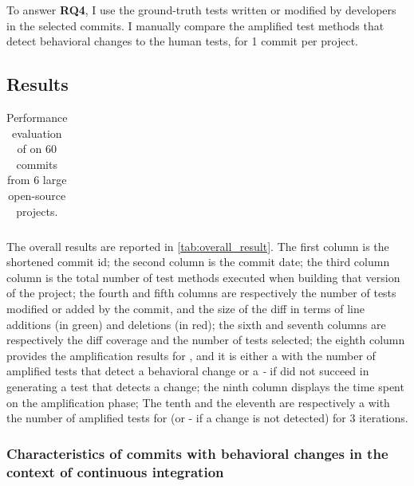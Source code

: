 To answer \textbf{RQ4}, I use the ground-truth tests written or modified by developers in the selected commits. %
I manually compare the amplified test methods that detect behavioral changes to the human tests, for 1 commit per project.

\subsection{Results}
\label{subsec:result}
\begin{table}
\centering
\small
\def\arraystretch{0.3}%
\setlength\tabcolsep{.35pt} %
\caption{Performance evaluation of \DCI on 60 commits from 6 large open-source projects.}
\label{tab:overall_result}
\begin{tabular}{l|c|rcccc|c|cc|cc|cc|cc}

\end{tabular}
\end{table}

The overall results are reported in \autoref{tab:overall_result}.
The first column is the shortened commit id;
the second column is the commit date;
the third column column is the total number of test methods executed when building that version of the project;
the fourth and fifth columns are respectively the number of tests modified or added by the commit, and the size of the diff in terms of line additions (in green) and deletions (in red);
the sixth and seventh columns are respectively the diff coverage and the number of tests \DCI selected;
the eighth column provides the amplification results for \DCIA, and it is either a \cmark with the number of amplified tests that detect a behavioral change or a \textit{-} if \DCI did not succeed in generating a test that detects a change;
the ninth column displays the time spent on the amplification phase;
The tenth and the eleventh are respectively a \cmark with the number of amplified tests for \DCII  (or - if a change is not detected) for 3 iterations.

\subsubsection{Characteristics of commits with behavioral changes in the context of continuous integration}
\label{subsec:dci:evaluation:characteristics}

